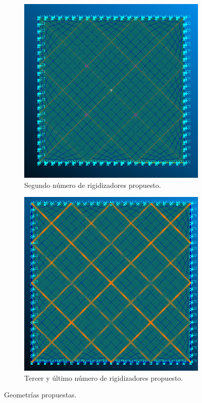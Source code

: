 \begin{figure}[H]
\begin{subfigure}[b]{0.5\linewidth}
    \includegraphics[scale = 0.35]{Figures/2rig.png} 
    \caption{Segundo número de rigidizadores propuesto.}
  \end{subfigure} 
  \begin{center}
  \begin{subfigure}[b]{0.5\linewidth}
  \centering
    \includegraphics[scale = 0.35]{Figures/3rig.png} 
    \caption{Tercer y último número de rigidizadores propuesto.}
  \end{subfigure}
    \end{center}
 \caption{Geometrías propuestas.}
 \label{fig: rigidizadoresinternos} 
\end{figure}

